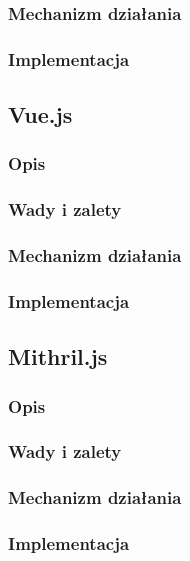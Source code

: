 \documentclass[polish, twoside, 12pt]{mwart}
\begin{document}
\subsubsection{Mechanizm działania}

\subsubsection{Implementacja}

\subsection{Vue.js}

\subsubsection{Opis}

\subsubsection{Wady i zalety}

\subsubsection{Mechanizm działania}

\subsubsection{Implementacja}

\subsection{Mithril.js}

\subsubsection{Opis}

\subsubsection{Wady i zalety}

\subsubsection{Mechanizm działania}

\subsubsection{Implementacja}
\end{document}
